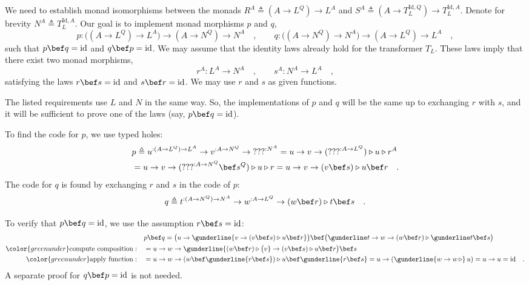 We need to establish monad isomorphisms between the monads $R^{A}\triangleq(A\rightarrow L^{Q})\rightarrow L^{A}$
and $S^{A}\triangleq(A\rightarrow T_{L}^{\text{Id},Q})\rightarrow T_{L}^{\text{Id},A}$.
Denote for brevity $N^{A}\triangleq T_{L}^{\text{Id},A}$. Our goal
is to implement monad morphisms $p$ and $q$,
\[
p:\big((A\rightarrow L^{Q})\rightarrow L^{A}\big)\rightarrow(A\rightarrow N^{Q})\rightarrow N^{A}\quad,\quad\quad q:\big((A\rightarrow N^{Q})\rightarrow N^{A}\big)\rightarrow(A\rightarrow L^{Q})\rightarrow L^{A}\quad,
\]
such that $p\bef q=\text{id}$ and $q\bef p=\text{id}$. We may assume
that the identity laws already hold for the transformer $T_{L}$.
These laws imply that there exist two monad morphisms,
\[
r^{A}:L^{A}\rightarrow N^{A}\quad,\quad\quad s^{A}:N^{A}\rightarrow L^{A}\quad,
\]
 satisfying the laws $r\bef s=\text{id}$ and $s\bef r=\text{id}$.
We may use $r$ and $s$ as given functions.

The listed requirements use $L$ and $N$ in the same way. So, the
implementations of $p$ and $q$ will be the same up to exchanging
$r$ with $s$, and it will be sufficient to prove one of the laws
(say, $p\bef q=\text{id}$).

To find the code for $p$, we use typed holes:
\begin{align*}
 & p\triangleq u^{:(A\rightarrow L^{Q})\rightarrow L^{A}}\rightarrow v^{:A\rightarrow N^{Q}}\rightarrow\text{???}^{:N^{A}}=u\rightarrow v\rightarrow(\text{???}^{:A\rightarrow L^{Q}})\triangleright u\triangleright r^{A}\\
 & =u\rightarrow v\rightarrow(\text{???}^{:A\rightarrow N^{Q}}\bef s^{Q})\triangleright u\triangleright r=u\rightarrow v\rightarrow(v\bef s)\triangleright u\bef r\quad.
\end{align*}
The code for $q$ is found by exchanging $r$ and $s$ in the code
of $p$:
\[
q\triangleq t^{:(A\rightarrow N^{Q})\rightarrow N^{A}}\rightarrow w^{:A\rightarrow L^{Q}}\rightarrow(w\bef r)\triangleright t\bef s\quad.
\]

To verify that $p\bef q=\text{id}$, we use the assumption $r\bef s=\text{id}$:
\begin{align*}
 & p\bef q=\big(u\rightarrow\gunderline{v\rightarrow(v\bef s)\triangleright u\bef r}\big)\bef\big(\gunderline t\rightarrow w\rightarrow(w\bef r)\triangleright\gunderline t\bef s\big)\\
{\color{greenunder}\text{compute composition}:}\quad & =u\rightarrow w\rightarrow\gunderline{(w\bef r)\triangleright\big(v}\rightarrow(v\bef s)\triangleright u\bef r\big)\bef s\\
{\color{greenunder}\text{apply function}:}\quad & =u\rightarrow w\rightarrow(w\bef\gunderline{r\bef s})\triangleright u\bef\gunderline{r\bef s}=u\rightarrow(\gunderline{w\rightarrow w\,\triangleright}\,u)=u\rightarrow u=\text{id}\quad.
\end{align*}
A separate proof for $q\bef p=\text{id}$ is not needed.

